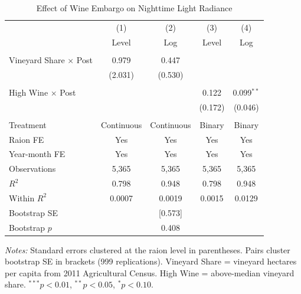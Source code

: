 \begin{table}[t]
\centering
\caption{Effect of Wine Embargo on Nighttime Light Radiance}
\label{tab:main}
\begin{tabular}{lcccc}
\hline\hline
 & (1) & (2) & (3) & (4) \\
 & Level & Log & Level & Log \\
\hline
\\[-1em]
Vineyard Share $\times$ Post & 0.979 & 0.447 & & \\
 & (2.031) & (0.530) & & \\
\\[-0.5em]
High Wine $\times$ Post & & & 0.122 & 0.099$^{**}$ \\
 & & & (0.172) & (0.046) \\
\\[-0.5em]
\hline
Treatment & Continuous & Continuous & Binary & Binary \\
Raion FE & Yes & Yes & Yes & Yes \\
Year-month FE & Yes & Yes & Yes & Yes \\
Observations & 5,365 & 5,365 & 5,365 & 5,365 \\
$R^2$ & 0.798 & 0.948 & 0.798 & 0.948 \\
Within $R^2$ & 0.0007 & 0.0019 & 0.0015 & 0.0129 \\
Bootstrap SE & & [0.573] & & \\
Bootstrap $p$ & & 0.408 & & \\
\hline\hline
\end{tabular}
\begin{tablenotes}
\item \textit{Notes:} Standard errors clustered at the raion level in parentheses.
Pairs cluster bootstrap SE in brackets (999 replications).
Vineyard Share = vineyard hectares per capita from 2011 Agricultural Census.
High Wine = above-median vineyard share.
$^{***}p<0.01$, $^{**}p<0.05$, $^{*}p<0.10$.
\end{tablenotes}
\end{table}
